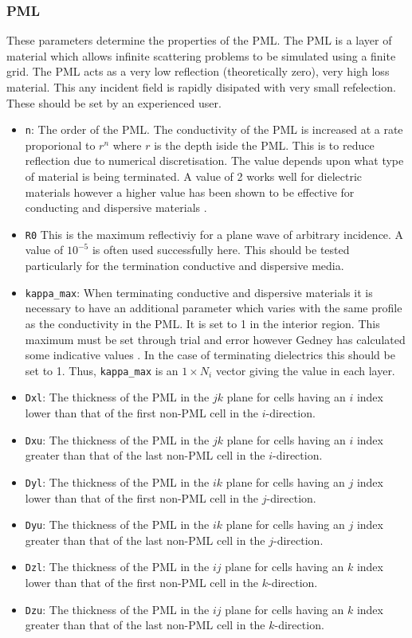 \documentclass[a4paper, 12pt]{article}
\begin{document}
	\subsubsection{PML}
	These parameters determine the properties of the PML. The PML is a
	layer of material which allows infinite scattering problems to be
	simulated using a finite grid. The PML acts as a very low reflection
	(theoretically zero), very high loss material. This any incident field
	is rapidly disipated with very small refelection. These should be set
	by an experienced user. 
	\begin{itemize}
		\item \verb+n+: The order of the PML. The conductivity of the PML is
		increased at a rate proporional to $r^n$ where $r$ is the depth
		iside the PML. This is to reduce reflection due to numerical
		discretisation. The value depends upon what type of material is
		being terminated. A value of 2 works well for dielectric materials
		however a higher value has been shown to be effective for conducting
		and dispersive materials \cite{gedney96electromagnetics399,gedney96ieeetransantprop1630}.
		\item \verb+R0+ This is the maximum reflectiviy for a plane wave of
		arbitrary incidence. A value of $10^{-5}$ is often used successfully
		here. This should be tested particularly for the termination conductive and dispersive
		media.
		\item \verb+kappa_max+: When terminating conductive and dispersive
		materials it is necessary to have an additional parameter which
		varies with the same profile as the conductivity in the PML. It is
		set to 1 in the interior region. This maximum must be set through
		trial and error however Gedney has calculated some indicative values
		\cite{gedney96electromagnetics399,gedney96ieeetransantprop1630}. In
		the case of terminating dielectrics this should be set to 1. Thus,
		\verb+kappa_max+ is an $1\times N_i$ vector giving the value in each layer.
		\item \verb+Dxl+: The thickness of the PML in the $jk$ plane for cells
		having an $i$ index lower than that of the first non-PML cell in the
		$i$-direction.
		\item \verb+Dxu+: The thickness of the PML in the $jk$ plane for cells
		having an $i$ index greater than that of the last non-PML cell in
		the $i$-direction.
		\item \verb+Dyl+: The thickness of the PML in the $ik$ plane for cells
		having an $j$ index lower than that of the first non-PML cell in the
		$j$-direction.
		\item \verb+Dyu+: The thickness of the PML in the $ik$ plane for cells
		having an $j$ index greater than that of the last non-PML cell in
		the $j$-direction.
		\item \verb+Dzl+: The thickness of the PML in the $ij$ plane for cells
		having an $k$ index lower than that of the first non-PML cell in the
		$k$-direction.
		\item \verb+Dzu+: The thickness of the PML in the $ij$ plane for cells
		having an $k$ index greater than that of the last non-PML cell in
		the $k$-direction.
	\end{itemize}
\end{document}
